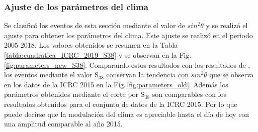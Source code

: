 		\subsubsection{Ajuste de los parámetros del clima}
		Se clasificó los eventos de esta sección mediante el valor de $sin^2\theta$ y se realizó el ajuste para obtener los parámetros del clima. Este ajuste se realizó en el periodo 2005-2018. Los valores obtenidos se resumen en la Tabla\,\ref{tabla:cuadratica_ICRC_2019_S38} y se  observan en la Fig.\,\ref{fig:parameters_new_S38}. Comparando estos resultados con los resultados de \cite{aab2017impact}, los eventos mediante el valor S$_{38}$  conservan la tendencia con $sin^2\theta$ que se observa en los datos de la ICRC 2015 en la Fig.\,\ref{fig:parameters_old}. Además los parámetros obtenidos mediante el corte por S$_{38}$ son comparables con los resultados obtenidos para el conjunto de datos de la ICRC 2015. Por lo que puede decirse que la modulación del clima es apreciable  hasta el día de hoy con una amplitud comparable al año 2015.
